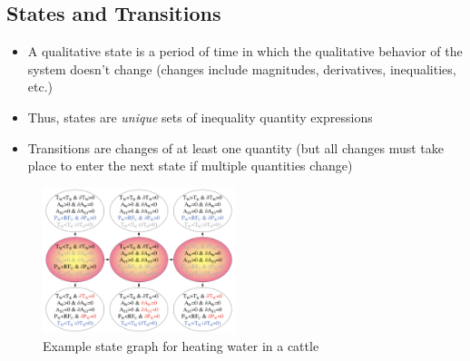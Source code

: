 \subsection{States and Transitions}
\begin{itemize}
	\item A qualitative state is a period of time in which the qualitative behavior of the system doesn't change (changes include magnitudes, derivatives, inequalities, etc.)
	\item Thus, states are \textit{unique} sets of inequality quantity expressions
	\item Transitions are changes of at least one quantity (but all changes must take place to enter the next state if multiple quantities change)
\end{itemize}
\begin{figure}[ht!]
	\centering
	\includegraphics[width=0.5\textwidth]{figures/kr_qr_state_graph_example.png}
	\caption{Example state graph for heating water in a cattle}
	\label{fig:kr_qr_state_graph_example}
\end{figure}

